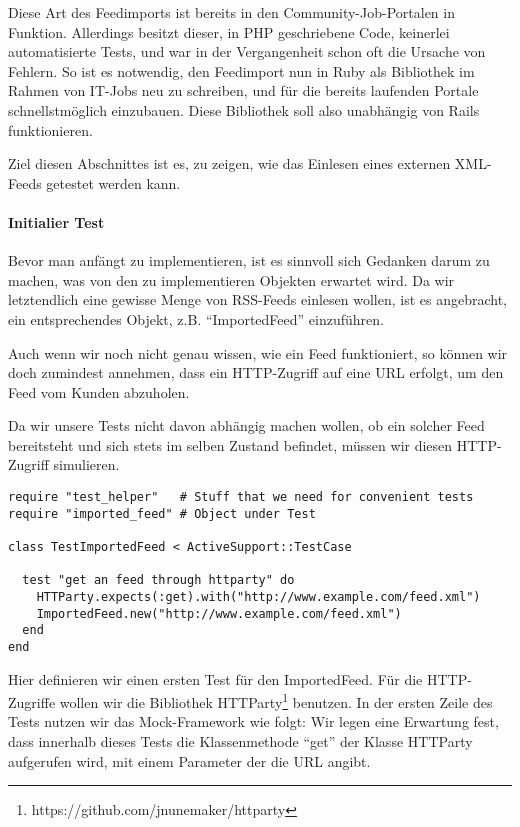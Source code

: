 Diese Art des Feedimports ist bereits in den Community-Job-Portalen in Funktion. Allerdings besitzt dieser, in PHP geschriebene Code, keinerlei automatisierte Tests, und war in der Vergangenheit schon oft die Ursache von Fehlern. So ist es notwendig, den Feedimport nun in Ruby als Bibliothek im Rahmen von IT-Jobs neu zu schreiben, und für die bereits laufenden Portale schnellstmöglich einzubauen. 
Diese Bibliothek soll also unabhängig von Rails funktionieren.

Ziel diesen Abschnittes ist es, zu zeigen, wie das Einlesen eines externen XML-Feeds getestet werden kann. 

\paragraph{Initialier Test}

Bevor man anfängt zu implementieren, ist es sinnvoll sich Gedanken darum zu machen, was von den zu implementieren Objekten erwartet wird. Da wir letztendlich eine gewisse Menge von RSS-Feeds einlesen wollen, ist es angebracht, ein entsprechendes Objekt, z.B. "`ImportedFeed"' einzuführen.

Auch wenn wir noch nicht genau wissen, wie ein Feed funktioniert, so können wir doch zumindest annehmen, dass ein HTTP-Zugriff auf eine URL erfolgt, um den Feed vom Kunden abzuholen.

Da wir unsere Tests nicht davon abhängig machen wollen, ob ein solcher Feed bereitsteht und sich stets im selben Zustand befindet, müssen wir diesen HTTP-Zugriff simulieren.

\begin{lstlisting}
require "test_helper"   # Stuff that we need for convenient tests
require "imported_feed" # Object under Test

class TestImportedFeed < ActiveSupport::TestCase

  test "get an feed through httparty" do
    HTTParty.expects(:get).with("http://www.example.com/feed.xml")
    ImportedFeed.new("http://www.example.com/feed.xml")
  end
end
\end{lstlisting}

Hier definieren wir einen ersten Test für den ImportedFeed. Für die HTTP-Zugriffe wollen wir die Bibliothek HTTParty\footnote{https://github.com/jnunemaker/httparty} benutzen. In der ersten Zeile des Tests nutzen wir das Mock-Framework wie folgt: Wir legen eine Erwartung fest, dass innerhalb dieses Tests die Klassenmethode "`get"' der Klasse HTTParty aufgerufen wird, mit einem Parameter der die URL angibt.

